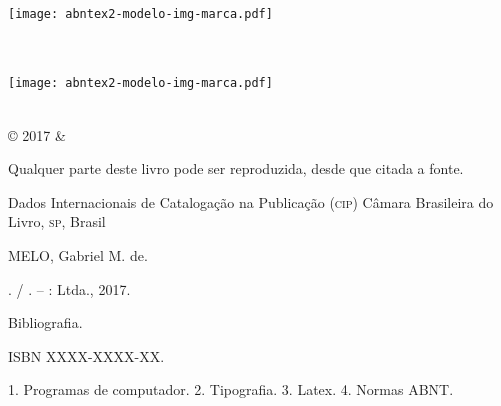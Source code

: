 \documentclass[
	10pt,				%
	openright,			%
	twoside,			%
	a5paper,			%
	english,			%
	french,				%
	spanish,			%
	brazil,				%
	sumario=tradicional
]{abntex2}
\begin{document}
\frenchspacing

\frontmatter

\begin{titlingpage}
\phantom{xxx}
\vspace{0.5cm}
\huge
\raggedright
\imprimirautor\\
\vspace{2.5cm}
\huge 
{\raggedleft
\texttt{[image: abntex2-modelo-img-marca.pdf]}\\[1cm]
\textit{\textcolor{blue}{\imprimirtitulo}}\\[1cm]
}
\centering 
\vfill
\Large
\imprimirinstituicao
\end{titlingpage}

\begin{titlingpage}

\phantom{xxx}
\vspace{0.5cm}
\huge
\raggedright
\imprimirautor\\
\vspace{2.5cm}
\huge 
{\raggedleft
\texttt{[image: abntex2-modelo-img-marca.pdf]}\\[1cm]
\textit{\textcolor{blue}{\imprimirtitulo}}\\[1cm]
}
\centering 
\vfill
\Large
\imprimirinstituicao

\clearpage
\ABNTEXfontereduzida
© 2017 \imprimirautor \space \& \imprimirinstituicao

Qualquer parte deste livro pode ser reproduzida, desde que citada a fonte.

\vspace*{\fill}

\begin{center}
Dados Internacionais de Catalogação na Publicação (\textsc{cip})
Câmara Brasileira do Livro, \textsc{sp}, Brasil
\end{center}

\begin{mdframed}
\noindent MELO, Gabriel M. de.

\imprimirtitulo. / \imprimirautor. -- \imprimirlocal: \imprimirinstituicao
Ltda., 2017.

\medskip

Bibliografia.

ISBN XXXX-XXXX-XX.

\medskip

1. Programas de computador. 2. Tipografia. 3. Latex. 4. Normas ABNT.

\end{mdframed}

\end{titlingpage}
\end{document}
